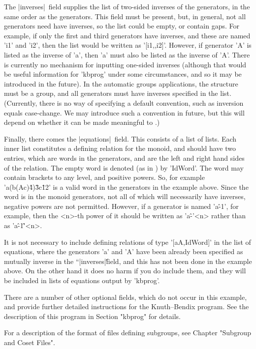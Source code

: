 The |inverses|\ field supplies the list of two-sided inverses of the
generators, in the same order as the generators. This field must be present,
but, in general, not all generators need have inverses, so the list could
be empty, or contain gaps. For example, if only the first and third
generators have inverses, and these are named 'i1' and 'i2', then the list
would be written as '[i1,,i2]'.  However, if generator 'A' is listed as the
inverse of 'a', then 'a' must also be listed as the inverse of 'A'.
There is currently no mechanism for inputting one-sided inverses (although
that would be useful information for 'kbprog' under some circumstances, and so
it may be introduced in the future).
In the automatic groups applications, the structure must be a group, and all
generators must have inverses specified in the list.
(Currently, there is no way of specifying a default convention, such as
inversion equals case-change. We may introduce such a convention in
future, but this will depend on whether it can be made meaningful to
{\GAP}.)

Finally, there comes the |equations|\ field. This consists of a list of
lists. Each inner list constitutes a defining relation for the
monoid, and should have two entries, which are words in the generators,
and are the left and right hand sides of the relation.
The empty word is denoted (as in {\GAP}) by 'IdWord'.
The word may contain brackets to any level, and positive powers.
So, for example 'a\*(b\*(A\*c)\^4)\^3\*c\^12' is a valid word in the generators
in the example above.
Since the word is in the monoid generators, not all of which will
necessarily have inverses, negative powers are not permitted.
However, if a generator is named 'a\^-1', for example, then the <n>-th 
power of it should be written as 'a\^-'<n> rather than as 'a\^-1\^'<n>.

It is not necessary to include defining relations of type
'[a\*A,IdWord]' in the list of equations, where the generators 'a' and 'A'
have been already been specified as mutually inverse in the ``|inverses|\'\'
field, and this has not been done in the example above. On the other hand
it does no harm if you do include them, and they will be included in
lists of equations output by 'kbprog'.

There are a number of other optional fields, which do not occur in this example,
and provide further detailed instructions for the Knuth--Bendix program.
See the description of this program in Section "kbprog" for details.

For a description of the format of files defining subgroups, see
Chapter "Subgroup and Coset Files".

